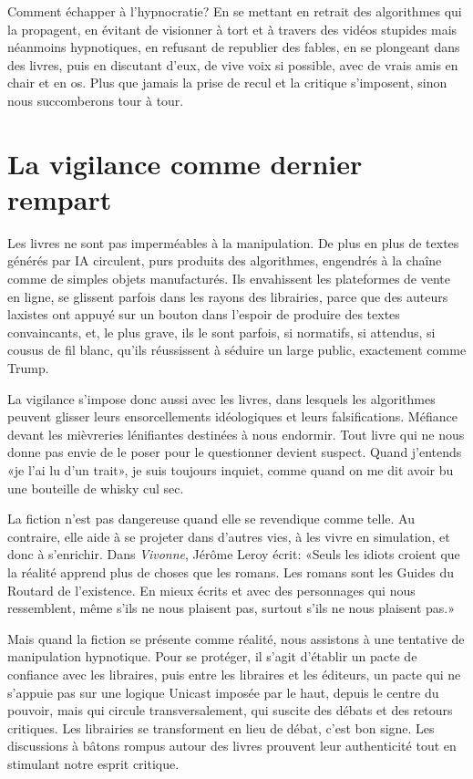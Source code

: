 \documentclass[a5paper, 10pt, twoside]{book}
\let\oldsection\section
\renewcommand{\section}[1]{%
  \oldsection{#1}%
  \par\vspace{\baselineskip}%
}
\begin{document}
Comment échapper à l’hypnocratie? En se mettant en retrait des
algorithmes qui la propagent, en évitant de visionner à tort et à
travers des vidéos stupides mais néanmoins hypnotiques, en refusant de
republier des fables, en se plongeant dans des livres, puis en discutant
d’eux, de vive voix si possible, avec de vrais amis en chair et en os.
Plus que jamais la prise de recul et la critique s’imposent, sinon nous
succomberons tour à tour.

\section{\texorpdfstring{La vigilance comme dernier
rempart}{    }}\label{la-vigilance-comme-dernier-rempart}

Les livres ne sont pas imperméables à la manipulation. De plus en plus
de textes générés par IA circulent, purs produits des algorithmes,
engendrés à la chaîne comme de simples objets manufacturés. Ils
envahissent les plateformes de vente en ligne, se glissent parfois dans
les rayons des librairies, parce que des auteurs laxistes ont appuyé sur
un bouton dans l’espoir de produire des textes convaincants, et, le plus
grave, ils le sont parfois, si normatifs, si attendus, si cousus de fil
blanc, qu’ils réussissent à séduire un large public, exactement comme
Trump.

La vigilance s’impose donc aussi avec les livres, dans lesquels les
algorithmes peuvent glisser leurs ensorcellements idéologiques et leurs
falsifications. Méfiance devant les mièvreries lénifiantes destinées à
nous endormir. Tout livre qui ne nous donne pas envie de le poser pour
le questionner devient suspect. Quand j’entends «je l’ai lu d’un trait»,
je suis toujours inquiet, comme quand on me dit avoir bu une bouteille
de whisky cul sec.

La fiction n’est pas dangereuse quand elle se revendique comme telle. Au
contraire, elle aide à se projeter dans d’autres vies, à les vivre en
simulation, et donc à s’enrichir. Dans \emph{Vivonne}, Jérôme Leroy
écrit: «Seuls les idiots croient que la réalité apprend plus de choses
que les romans. Les romans sont les Guides du Routard de l’existence. En
mieux écrits et avec des personnages qui nous ressemblent, même s’ils ne
nous plaisent pas, surtout s’ils ne nous plaisent pas.»

Mais quand la fiction se présente comme réalité, nous assistons à une
tentative de manipulation hypnotique. Pour se protéger, il s’agit
d’établir un pacte de confiance avec les libraires, puis entre les
libraires et les éditeurs, un pacte qui ne s’appuie pas sur une logique
Unicast imposée par le haut, depuis le centre du pouvoir, mais qui
circule transversalement, qui suscite des débats et des retours
critiques. Les librairies se transforment en lieu de débat, c’est bon
signe. Les discussions à bâtons rompus autour des livres prouvent leur
authenticité tout en stimulant notre esprit critique.
\end{document}
